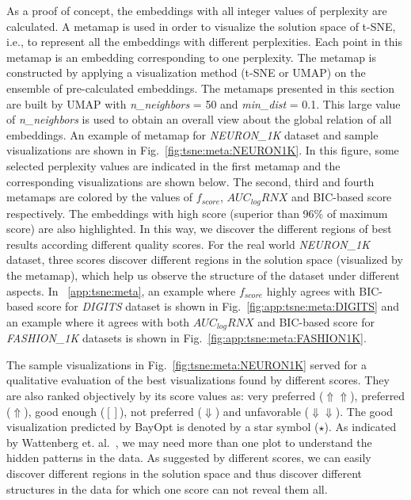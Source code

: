 As a proof of concept, the embeddings with all integer values of perplexity are calculated.
A metamap is used in order to visualize the solution space of t-SNE, i.e., to represent all the embeddings with different perplexities.
Each point in this metamap is an embedding corresponding to one perplexity.
The metamap is constructed by applying a visualization method (t-SNE or UMAP) on the ensemble of pre-calculated embeddings.
The metamaps presented in this section are built by UMAP with \emph{n\_neighbors} = 50 and \emph{min\_dist} = 0.1.
This large value of \emph{n\_neighbors} is used to obtain an overall view about the global relation of all embeddings.
An example of metamap for \emph{NEURON\_1K} dataset and sample visualizations are shown in Fig.~\ref{fig:tsne:meta:NEURON1K}.
In this figure, some selected perplexity values are indicated in the first metamap and the corresponding visualizations are shown below.
The second, third and fourth metamaps are colored by the values of $f_{score}$, $AUC_{log}RNX$ and BIC-based score respectively.
The embeddings with high score (superior than 96\% of maximum score) are also highlighted.
In this way, we discover the different regions of best results according different quality scores.
For the real world \emph{NEURON\_1K} dataset, three scores discover different regions in the solution space (visualized by the metamap), which help us observe the structure of the dataset under different aspects.
In ~\ref{app:tsne:meta}, an example where $f_{score}$ highly agrees with BIC-based score for \emph{DIGITS} dataset is shown in Fig.~\ref{fig:app:tsne:meta:DIGITS}
and an example where it agrees with both $AUC_{log}RNX$ and BIC-based score for \emph{FASHION\_1K} datasets is shown in Fig.~\ref{fig:app:tsne:meta:FASHION1K}.

The sample visualizations in Fig.~\ref{fig:tsne:meta:NEURON1K} served for a qualitative evaluation of the best visualizations found by different scores.
They are also ranked objectively by its score values as: very preferred ($\Uparrow\Uparrow$), preferred ($\Uparrow$), good enough ($[]$), not preferred ($\Downarrow$) and unfavorable ($\Downarrow\Downarrow$).
The good visualization predicted by BayOpt is denoted by a star symbol ($\star$).
As indicated by Wattenberg et. al.~\cite{wattenberg2016use}, we may need more than one plot to understand the hidden patterns in the data.
As suggested by different scores, we can easily discover different regions in the solution space and thus discover different structures in the data for which one score can not reveal them all.


